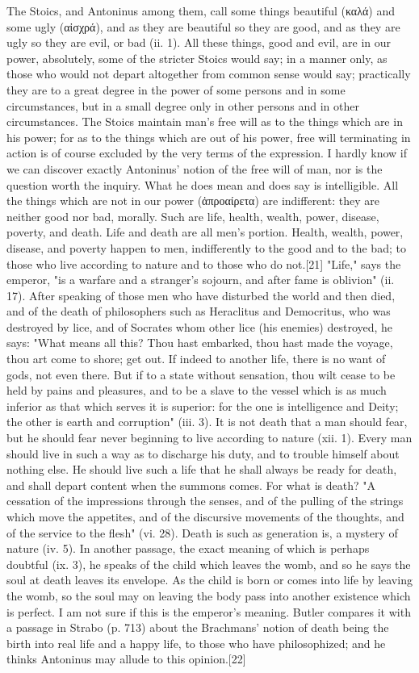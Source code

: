 The Stoics, and Antoninus among them, call some things beautiful \textgreek{(καλά}) and some ugly (\textgreek{αἰσχρά}), and as they are beautiful so they are good, and as they are ugly so they are evil, or bad (ii. 1). All these things, good and evil, are in our power, absolutely, some of the stricter Stoics would say; in a manner only, as those who would not depart altogether from common sense would say; practically they are to a great degree in the power of some persons and in some circumstances, but in a small degree only in other persons and in other circumstances. The Stoics maintain man's free will as to the things which are in his power; for as to the things which are out of his power, free will terminating in action is of course excluded by the very terms of the expression. I hardly know if we can discover exactly Antoninus' notion of the free will of man, nor is the question worth the inquiry. What he does mean and does say is intelligible. All the things which are not in our power (\textgreek{ἀπροαίρετα}) are indifferent: they are neither good nor bad, morally. Such are life, health, wealth, power, disease, poverty, and death. Life and death are all men's portion. Health, wealth, power, disease, and poverty happen to men, indifferently to the good and to the bad; to those who live according to nature and to those who do not.[21] "Life," says the emperor, "is a warfare and a stranger's sojourn, and after fame is oblivion" (ii. 17). After speaking of those men who have disturbed the world and then died, and of the death of philosophers such as Heraclitus and Democritus, who was destroyed by lice, and of Socrates whom other lice (his enemies) destroyed, he says: "What means all this? Thou hast embarked, thou hast made the voyage, thou art come to shore; get out. If indeed to another life, there is no want of gods, not even there. But if to a state without sensation, thou wilt cease to be held by pains and pleasures, and to be a slave to the vessel which is as much inferior as that which serves it is superior: for the one is intelligence and Deity; the other is earth and corruption" (iii. 3). It is not death that a man should fear, but he should fear never beginning to live according to nature (xii. 1). Every man should live in such a way as to discharge his duty, and to trouble himself about nothing else. He should live such a life that he shall always be ready for death, and shall depart content when the summons comes. For what is death? "A cessation of the impressions through the senses, and of the pulling of the strings which move the appetites, and of the discursive movements of the thoughts, and of the service to the flesh" (vi. 28). Death is such as generation is, a mystery of nature (iv. 5). In another passage, the exact meaning of which is perhaps doubtful (ix. 3), he speaks of the child which leaves the womb, and so he says the soul at death leaves its envelope. As the child is born or comes into life by leaving the womb, so the soul may on leaving the body pass into another existence which is perfect. I am not sure if this is the emperor's meaning. Butler compares it with a passage in Strabo (p. 713) about the Brachmans' notion of death being the birth into real life and a happy life, to those who have philosophized; and he thinks Antoninus may allude to this opinion.[22]

